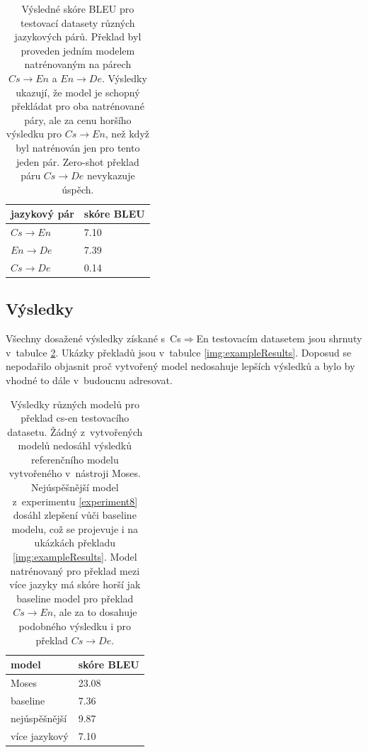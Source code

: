 \begin{table}[H]
    \begin{center}
        \begin{tabular}{ll}
          \toprule
          jazykový pár & skóre BLEU \\
          \midrule
          $Cs\rightarrow En$ & 7.10 \\
          $En\rightarrow De$ & 7.39 \\
          $Cs\rightarrow De$ &  0.14 \\
          \bottomrule
        \end{tabular}
    \end{center}
	\caption{Výsledné skóre BLEU pro testovací datasety různých jazykových párů. Překlad byl proveden jedním modelem natrénovaným na párech $Cs\rightarrow En$ a $En\rightarrow De$. Výsledky ukazují, že model je schopný překládat pro oba natrénované páry, ale za cenu horšího výsledku pro $Cs\rightarrow En$, než když byl natrénován jen pro tento jeden pár. Zero-shot překlad páru $Cs\rightarrow De$ nevykazuje úspěch.}
	\label{table:resultsMulti}
\end{table}

\subsection{Výsledky}
Všechny dosažené výsledky získané s~Cs$\Rightarrow$En testovacím datasetem jsou shrnuty v~tabulce \ref{table:results}. Ukázky překladů jsou v~tabulce \ref{img:exampleResults}. Doposud se nepodařilo objasnit proč vytvořený model nedosahuje lepších výsledků a bylo by vhodné to dále v~budoucnu adresovat.

\begin{table}[H]
    \begin{center}
        \begin{tabular}{ll}
          \toprule
           model & skóre BLEU \\
          \midrule
           Moses & 23.08 \\
           baseline & 7.36 \\
           nejúspěšnější & 9.87 \\
           více jazykový & 7.10 \\
          \bottomrule
        \end{tabular}
    \end{center}
	\caption{Výsledky různých modelů pro překlad cs-en testovacího datasetu. Žádný z~vytvořených modelů nedosáhl výsledků referenčního modelu vytvořeného v~nástroji Moses. Nejúspěšnější model z~experimentu \ref{experiment8} dosáhl zlepšení vůči baseline modelu, což se projevuje i na ukázkách překladu \ref{img:exampleResults}. Model natrénovaný pro překlad mezi více jazyky má skóre horší jak baseline model pro překlad $Cs\rightarrow En$, ale za to dosahuje podobného výsledku i pro překlad $Cs\rightarrow De$.}
	\label{table:results}
\end{table}


